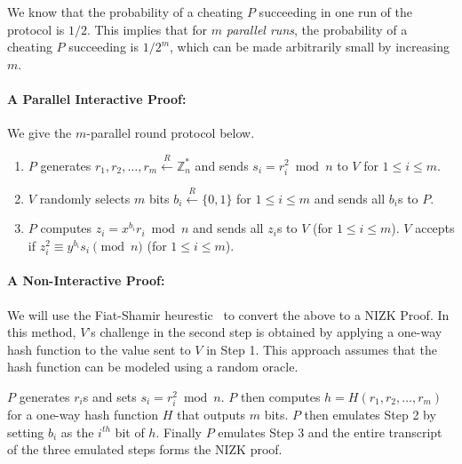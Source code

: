 \documentclass[]{report}   %
\newcommand{\rand}{\stackrel{R}{\leftarrow}}
\begin{document}
We know that the probability of a cheating $P$ succeeding in one run of the protocol is $1/2$. This implies that for $m$ {\em parallel runs}, the probability of a cheating $P$ succeeding is $1/2^m$, which can be made arbitrarily small by increasing $m$. 

\paragraph{A Parallel Interactive Proof:} We give the $m$-parallel round protocol below.

\begin{enumerate}
	\item $P$ generates $r_1, r_2, \ldots, r_m\rand \mathbb{Z}^*_n$ and sends $s_i = r_i^2\bmod{n}$ to $V$ for $1\leq i\leq m$.
	\item $V$ randomly selects $m$ bits $b_i\rand \{0, 1\}$  for $1\leq i\leq m$ and sends all $b_i$s to $P$.
	\item $P$ computes $z_i=x^{b_i}r_i \bmod{n}$ and sends all $z_i$s to $V$ (for $1\leq i\leq m$). $V$ accepts if $z_i^2 \equiv y^{b_i}s_i\pmod{n}$  (for $1\leq i\leq m$).
\end{enumerate}

\paragraph{A Non-Interactive Proof:} We will use the Fiat-Shamir heurestic~\cite{fiat1986prove} to convert the above to a NIZK Proof. In this method, $V$'s challenge in the second step is obtained by applying a  one-way hash function to the value sent to $V$ in Step 1. This approach assumes that the hash function can be modeled using a random oracle.

$P$ generates $r_i$s and sets $s_i = r_i^2\bmod{n}$. $P$ then computes $h = H(r_1, r_2, \ldots, r_m)$ for a one-way hash function $H$ that outputs $m$ bits. $P$ then emulates Step 2 by setting $b_i$ as the $i^{th}$ bit of $h$. Finally $P$ emulates Step 3 and the entire transcript of the three emulated steps forms the NIZK proof.
\end{document}
